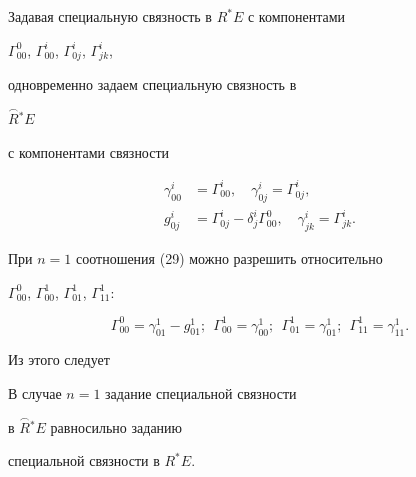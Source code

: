 \begin{notes}


Задавая специальную связность в $R^ * E$ с компонентами


$\Gamma_{00}^0$, $\Gamma_{00}^i$, $\Gamma_{0j}^i$, $\Gamma_{jk}^i$,


одновременно задаем специальную связность в


$\overset{\frown}{R}{}^ * E$


с компонентами связности


\begin{equation}


\begin{split}


\gamma_{00}^i&=\Gamma_{00}^i,\quad \gamma_{0j}^i=\Gamma_{0j}^i, \\


g_{0j}^i&=\Gamma_{0j}^i-\delta_j^i \Gamma_{00}^0,


\quad\gamma_{jk}^i=\Gamma_{jk}^i. 


\end{split} 


\end{equation}


При $n=1$ соотношения (29) можно разрешить относительно


$\Gamma_{00}^0$, $\Gamma_{00}^1$, $\Gamma_{01}^1$, $\Gamma_{11}^1$:


$$


\Gamma_{00}^0=\gamma_{01}^1-g_{01}^1;


\ \ \Gamma_{00}^1=\gamma_{00}^1;\ \ \Gamma_{01}^1


=\gamma_{01}^1;\ \ \Gamma_{11}^1=\gamma_{11}^1.


$$


\end{notes}





Из этого следует





\begin{notes}


В случае $n=1$ задание специальной связности


в $\overset{\frown}{R}{}^ * E$ равносильно заданию


специальной связности в $R^ * E$.


\end{notes}





